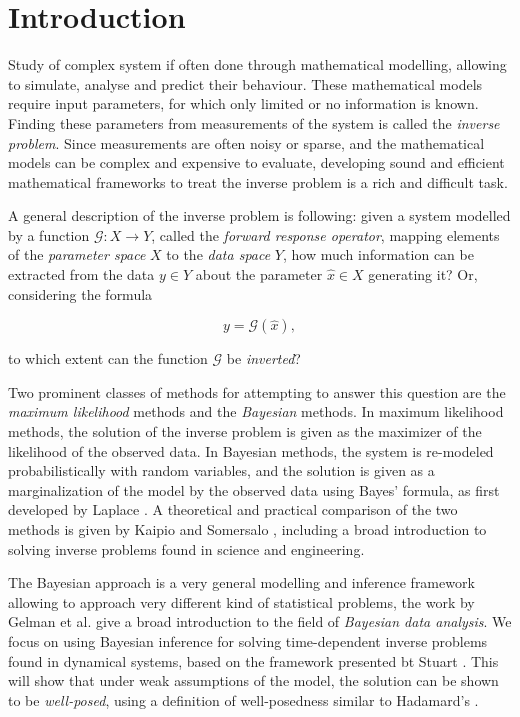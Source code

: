 \section{Introduction}
\setcounter{page}{1}
\thispagestyle{empty}

Study of complex system if often done through mathematical modelling, allowing to simulate, analyse and predict their behaviour. These mathematical models require input parameters, for which only limited or no information is known. Finding these parameters from measurements of the system is called the \textit{inverse problem}. Since measurements are often noisy or sparse, and the mathematical models can be complex and expensive to evaluate, developing sound and efficient mathematical frameworks to treat the inverse problem is a rich and difficult task.

A general description of the inverse problem is following: given a system modelled by a function $\mathcal{G} : X \rightarrow Y$, called the \textit{forward response operator}, mapping elements of the \textit{parameter space} $X$ to the \textit{data space} $Y$, how much information can be extracted from the data $y \in Y$ about the parameter $\hat{x} \in X$ generating it? Or, considering the formula

\begin{equation*}
  y = \mathcal{G}(\hat{x}),
\end{equation*}

to which extent can the function $\mathcal{G}$ be \textit{inverted}?

Two prominent classes of methods for attempting to answer this question are the \textit{maximum likelihood} methods and the \textit{Bayesian} methods. In maximum likelihood methods, the solution of the inverse problem is given as the maximizer of the likelihood of the observed data. In Bayesian methods, the system is re-modeled probabilistically with random variables, and the solution is given as a marginalization of the model by the observed data using Bayes' formula, as first developed by Laplace \cite{laplace1820theorie}. A theoretical and practical comparison of the two methods is given by Kaipio and Somersalo \cite{kaipio2006statistical}, including a broad introduction to solving inverse problems found in science and engineering. 

The Bayesian approach is a very general modelling and inference framework allowing to approach very different kind of statistical problems, the work by Gelman et al. \cite{gelman} give a broad introduction to the field of \textit{Bayesian data analysis}. We focus on using Bayesian inference for solving time-dependent inverse problems found in dynamical systems, based on the framework presented bt Stuart \cite{stuart_2010}. This will show that under weak assumptions of the model, the solution can be shown to be \textit{well-posed}, using a definition of well-posedness similar to Hadamard's \cite{hadamard}.

